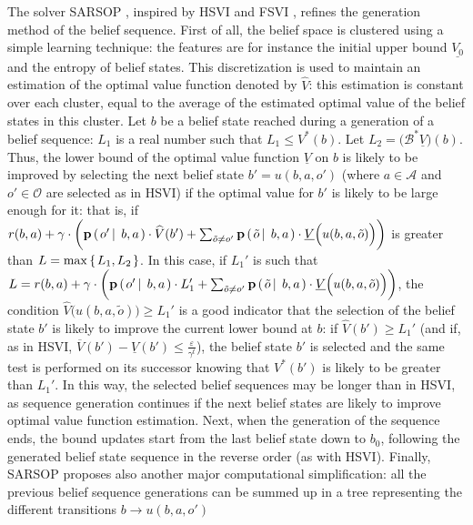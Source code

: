 The solver SARSOP \cite{Kurniawati-RSS08}, inspired by HSVI and FSVI \cite{shani}, 
refines the generation method of the belief sequence. 
First of all, the belief space is clustered using a simple learning technique:
the features are for instance the initial upper bound 
$\underline{V_0}$ and the entropy of belief states.
This discretization is used to maintain an estimation of the optimal value function denoted by $\widehat{V}$:
this estimation is constant over each cluster, equal to 
the average of the estimated optimal value of the belief states in this cluster.
Let $b$ be a belief state reached during a generation of a belief sequence:
$L_1$ is a real number such that $L_1 \leqslant V^*(b)$.
Let $L_2 = \Big( \mathcal{B}^* \underline{V} \Big)(b)$. 
Thus, the lower bound of the optimal value function $\underline{V}$ on $b$
is likely to be improved by selecting the next belief state $b'=u(b,a,o')$ 
(where $a \in \mathcal{A}$ and $o' \in \mathcal{O}$ are selected as in HSVI)
if the optimal value for $b'$ is likely to be large enough for it:
that is, if $r(b,a) + \gamma \cdot \bigg( \textbf{p} \left( \left.  o' \, \right| \left. \, b,a  \right. \right) \cdot \widehat{V}(b') + \sum_{\tilde{o} \neq o'} \textbf{p} \left( \left.  \tilde{o} \, \right| \left. \, b,a  \right. \right) \cdot \underline{V}\Big(u(b,a,\tilde{o})\Big) \bigg)$ is greater than $L = \max \left\{ \left.  L_1, L_2  \right. \right\}$.
In this case, if $L_1'$ is such that $L = r(b,a) + \gamma \cdot \bigg( \textbf{p} \left( \left.  o' \, \right| \left. \, b,a  \right. \right) \cdot L_1' + \sum_{\tilde{o} \neq o'} \textbf{p} \left( \left.  \tilde{o} \, \right| \left. \, b,a  \right. \right) \cdot \underline{V}\Big(u(b,a,\tilde{o})\Big) \bigg)$, 
the condition $\widehat{V}\Big(u(b,a,\tilde{o})\Big) \geqslant L_1'$ 
is a good indicator that the selection of the belief state $b'$ is likely to improve the current lower bound at $b$:
if $\widehat{V}(b') \geqslant L_1'$ (and if, as in HSVI, $\overline{V}(b') - \underline{V}(b') \leqslant \frac{\varepsilon}{\gamma^t}$), 
the belief state $b'$ is selected and the same test is performed on its successor knowing that $V^*(b')$ is likely to be greater than $L_1'$.
In this way, the selected belief sequences may be longer than in HSVI,
as sequence generation continues if the next belief states are likely to improve optimal value function estimation. 
Next, when the generation of the sequence ends, 
the bound updates start from the last belief state down to $b_0$, 
following the generated belief state sequence
in the reverse order (as with HSVI).
Finally, SARSOP proposes also another major computational simplification:
all the previous belief sequence generations can be summed up  
in a tree representing the different transitions $b \rightarrow u(b,a,o')$
